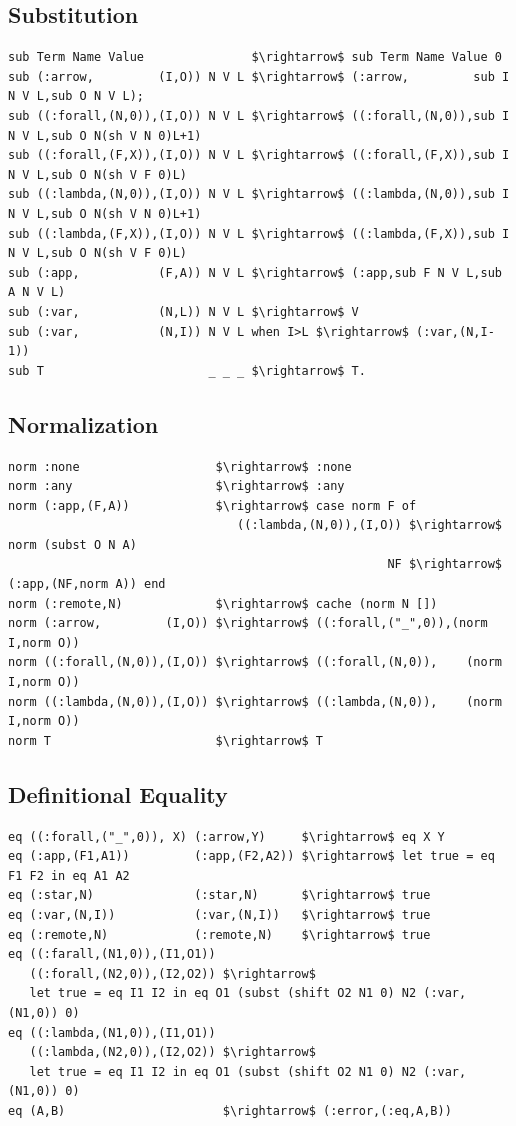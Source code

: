 \documentclass[11pt,oneside]{article}
\begin{document}
\subsection{Substitution}

\begin{lstlisting}[mathescape=true]
sub Term Name Value               $\rightarrow$ sub Term Name Value 0
sub (:arrow,         (I,O)) N V L $\rightarrow$ (:arrow,         sub I N V L,sub O N V L);
sub ((:forall,(N,0)),(I,O)) N V L $\rightarrow$ ((:forall,(N,0)),sub I N V L,sub O N(sh V N 0)L+1)
sub ((:forall,(F,X)),(I,O)) N V L $\rightarrow$ ((:forall,(F,X)),sub I N V L,sub O N(sh V F 0)L)
sub ((:lambda,(N,0)),(I,O)) N V L $\rightarrow$ ((:lambda,(N,0)),sub I N V L,sub O N(sh V N 0)L+1)
sub ((:lambda,(F,X)),(I,O)) N V L $\rightarrow$ ((:lambda,(F,X)),sub I N V L,sub O N(sh V F 0)L)
sub (:app,           (F,A)) N V L $\rightarrow$ (:app,sub F N V L,sub A N V L)
sub (:var,           (N,L)) N V L $\rightarrow$ V
sub (:var,           (N,I)) N V L when I>L $\rightarrow$ (:var,(N,I-1))
sub T                       _ _ _ $\rightarrow$ T.
\end{lstlisting}

\subsection{Normalization}

\begin{lstlisting}[mathescape=true]
norm :none                   $\rightarrow$ :none
norm :any                    $\rightarrow$ :any
norm (:app,(F,A))            $\rightarrow$ case norm F of
                                ((:lambda,(N,0)),(I,O)) $\rightarrow$ norm (subst O N A)
                                                     NF $\rightarrow$ (:app,(NF,norm A)) end
norm (:remote,N)             $\rightarrow$ cache (norm N [])
norm (:arrow,         (I,O)) $\rightarrow$ ((:forall,("_",0)),(norm I,norm O))
norm ((:forall,(N,0)),(I,O)) $\rightarrow$ ((:forall,(N,0)),    (norm I,norm O))
norm ((:lambda,(N,0)),(I,O)) $\rightarrow$ ((:lambda,(N,0)),    (norm I,norm O))
norm T                       $\rightarrow$ T
\end{lstlisting}

\subsection{Definitional Equality}

\begin{lstlisting}[mathescape=true]
eq ((:forall,("_",0)), X) (:arrow,Y)     $\rightarrow$ eq X Y
eq (:app,(F1,A1))         (:app,(F2,A2)) $\rightarrow$ let true = eq F1 F2 in eq A1 A2
eq (:star,N)              (:star,N)      $\rightarrow$ true
eq (:var,(N,I))           (:var,(N,I))   $\rightarrow$ true
eq (:remote,N)            (:remote,N)    $\rightarrow$ true
eq ((:farall,(N1,0)),(I1,O1))
   ((:forall,(N2,0)),(I2,O2)) $\rightarrow$
   let true = eq I1 I2 in eq O1 (subst (shift O2 N1 0) N2 (:var,(N1,0)) 0)
eq ((:lambda,(N1,0)),(I1,O1))
   ((:lambda,(N2,0)),(I2,O2)) $\rightarrow$
   let true = eq I1 I2 in eq O1 (subst (shift O2 N1 0) N2 (:var,(N1,0)) 0)
eq (A,B)                      $\rightarrow$ (:error,(:eq,A,B))
\end{lstlisting}
\end{document}
